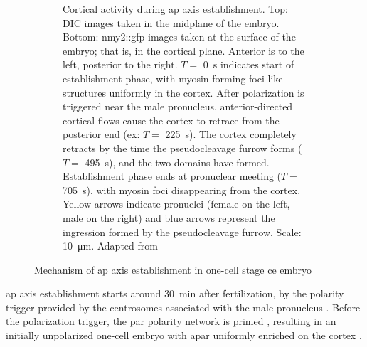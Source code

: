 \begin{figure}
\begin{subfigure}{\textwidth}
    \caption{Cortical activity during \acs{ap} axis establishment. Top: DIC images taken in the midplane of the embryo. Bottom: \acs{nmy2}::\acs{gfp} images taken at the surface of the embryo; that is, in the cortical plane. Anterior is to the left, posterior to the right. $T=$ \SI{0}{\second} indicates start of establishment phase, with myosin forming foci-like structures uniformly in the cortex. After polarization is triggered near the male pronucleus, anterior-directed cortical flows cause the cortex to retrace from the posterior end (ex: $T=$ \SI{225}{\second}). The cortex completely retracts by the time the pseudocleavage furrow forms ($T=$ \SI{495}{\second}), and the two domains have formed. Establishment phase ends at pronuclear meeting ($T=$ \SI{705}{\second}), with myosin foci disappearing from the cortex. Yellow arrows indicate pronuclei (female on the left, male on the right) and blue arrows represent the ingression formed by the pseudocleavage furrow. Scale: \SI{10}{\micro\meter}. Adapted from \cite{sundar2012regulation}}
    \label{subfig:apAxisEstablishmentMechanism-micrograph}
\end{subfigure}

\caption[\acs{ap} axis establishment in \acs{ce}]{Mechanism of \acs{ap} axis establishment in one-cell stage \acs{ce} embryo}
\label{fig:apAxisEstablishmentMechanism}

\end{figure}

\ac{ap} axis establishment starts around \SI{30}{\minute} after fertilization, by the polarity trigger provided by the centrosomes associated with the male pronucleus \citep{o2000spd,wallenfang2000polarization,cowan2004centrosomes,de2020mitochondria}. Before the polarization trigger, the \ac{par} polarity network is primed \citep{zhao2019aurora,reich2019regulated,kapoor2019centrosome,klinkert2019aurora}, resulting in an initially unpolarized one-cell embryo with \ac{apar} uniformly enriched on the cortex \citep{cuenca2003polarization,cowan2004asymmetric,schonegg2006cdc}. 

